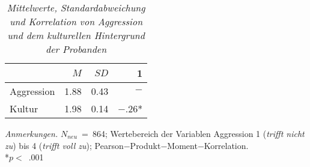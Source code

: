 \begin{table}[htb]
  \caption[Mittelwerte, Standardabweichung und Korrelation von Aggression und dem kulturellen Hintergrund der Probanden]{\textit {Mittelwerte, Standardabweichung und Korrelation von Aggression und dem kulturellen Hintergrund der Probanden}} 
  \label{explo_4_4_2}
  \centering
  \begin{adjustbox}{width=6cm} %
  \small
  \begin{tabular}{lrrr}
    \hline
      & $M$   & $SD$ & 1 \\
    \hline
  Aggression      & 1.88 & 0.43  & $-$      \\
  Kultur          & 1.98 & 0.14  & $-$.26*      \\
     \hline
  \end{tabular}
  \end{adjustbox}
  
  \begin{tablenotes}
      \item \textit{Anmerkungen.} \( N_{neu} \)~=~864; Wertebereich der Variablen Aggression 1 (\textit{trifft nicht zu}) bis 4 (\textit{trifft voll zu}); Pearson$-$Produkt$-$Moment$-$Korrelation. \\ *$p<$~.001
    \end{tablenotes}
  \end{table}

